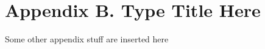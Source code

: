 \clearpage
{}
{}
\part*{Appendix B. Type Title Here}
\thispagestyle{empty} %
Some other appendix stuff are inserted here